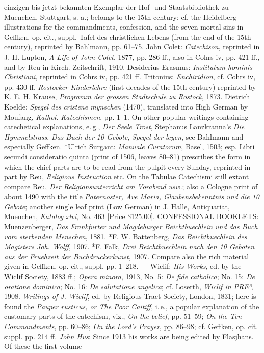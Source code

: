 einzigen bis jetzt bekannten Exemplar der Hof- und Staatsbibliothek zu Muenchen, Stuttgart, s. a.; belongs to the 15th century; cf. the Heidelberg illustrations for the commandments, confession, and the seven mortal sins in Geffken, op. cit., suppl. Tafel des christlichen Lebens (from the end of the 15th century), reprinted by Bahlmann, pp. 61–75. John Colet: \emph{Catechison}, reprinted in J. H. Lupton, \emph{A Life of John Colet}, 1877, pp. 286 ff., also in Cohrs iv, pp. 421 ff., and by Reu in Kirch. Zeitschrift, 1910. Desiderius Erasmus: \emph{Institutum hominis Christiani}, reprinted in Cohrs iv, pp. 421 ff. Tritonius: \emph{Enchiridion}, cf. Cohrs iv, pp. 430 ff. \emph{Rostocker Kinderlehre} (first decades of the 15th century) reprinted by K. E. H. Krause, \emph{Programm der grossen Stadtschule zu Rostock}, 1873. Dietrich Koelde: \emph{Spegel des cristene mynschen} (1470), translated into High German by Moufang, \emph{Kathol. Katechismen}, pp. 1–1. On other popular writings containing catechetical explanations, e.\,g., \emph{Der Seele Trost}, Stephanus Lanzkranna’s \emph{Die Hymmelstrass}, \emph{Das Buch der 10 Gebote}, \emph{Spegel der leyen}, see Bahlmann and especially Geffken. *Ulrich Surgant: \emph{Manuale Curatorum}, Basel, 1503; esp. Libri secundi consideratio quinta (print of 1506, leaves 80–81) prescribes the form in which the chief parts are to be read from the pulpit every Sunday, reprinted in part by Reu, \emph{Religious Instruction} etc. On the Tabulae Catechismi still extant compare Reu, \emph{Der Religionsunterricht am Vorabend usw.}; also a Cologne print of about 1490 with the title \emph{Paternoster, Ave Maria, Glaubensbekenntnis und die 10 Gebote}; another single leaf print (Low German) in J. Halle, Antiquariat, Muenchen, \emph{Katalog xlvi}, No. 463 [Price \$125.00]. CONFESSIONAL BOOKLETS: Muenzenberger, \emph{Das Frankfurter und Magdeburger Beichtbuechlein und das Buch vom sterbenden Menschen}, 1881. *F. W. Battenberg, \emph{Das Beichtbuechlein des Magisters Joh. Wolff}, 1907. *F. Falk, \emph{Drei Beichtbuechlein nach den 10 Geboten aus der Fruehzeit der Buchdruckerkunst}, 1907. Compare also the rich material given in Geffken, op. cit., suppl. pp. 1–218. — Wiclif: \emph{His Works}, ed. by the Wiclif Society, 1883 ff.; \emph{Opera minora}, 1913, No. 5: \emph{De fide catholica}; No. 15: \emph{De oratione dominica}; No. 16: \emph{De salutatione angelica}; cf. Loserth, \emph{Wiclif in PRE³}, 1908. \emph{Writings of J. Wiclif}, ed. by Religious Tract Society, London, 1831; here is found the \emph{Pauper rusticus, or The Poor Caitiff}, i.\,e., a popular explanation of the customary parts of the catechism, viz., \emph{On the belief}, pp. 51–59; \emph{On the Ten Commandments}, pp. 60–86; \emph{On the Lord’s Prayer}, pp. 86–98; cf. Geffken, op. cit. suppl. pp. 214 ff. \emph{John Hus}: Since 1913 his works are being edited by Flasjhans. Of these the first volume
